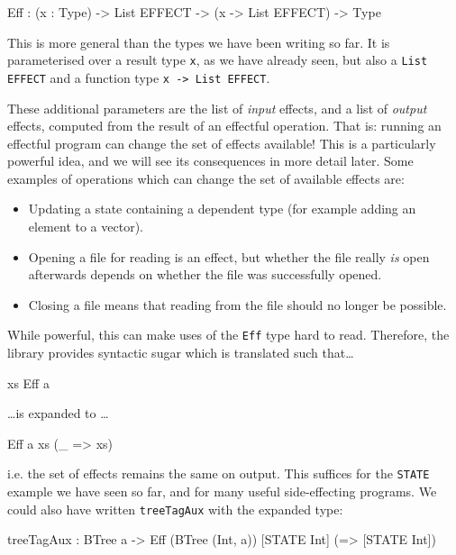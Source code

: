 \begin{code}
Eff : (x : Type) ->
      List EFFECT -> (x -> List EFFECT) -> Type
\end{code}

\noindent
This is more general than the types we have been writing so far. It is
parameterised over a result type \texttt{x},
as we have already seen, but also a \texttt{List EFFECT} and a function type
\texttt{x -> List EFFECT}.

These additional parameters are the list of \emph{input} effects, and a list
of \emph{output} effects, computed from the result of an effectful operation.
That is: running an effectful program can change the set of effects available!
This is a particularly powerful idea, and we will see its consequences in more
detail later. Some examples of operations which can change the set of available
effects are:

\begin{itemize}
\item Updating a state containing a dependent type (for example adding an
element to a vector).
\item Opening a file for reading is an effect, but whether the file really
\emph{is} open afterwards depends on whether the file was successfully opened.
\item Closing a file means that reading from the file should no longer be
possible.
\end{itemize}

\noindent
While powerful, this can make uses of the \texttt{Eff} type hard to read.
Therefore, the \effects{} library provides syntactic sugar which is translated
such that\ldots

\begin{code}
{ xs } Eff a 
\end{code}

\ldots is expanded to \ldots

\begin{code}
Eff a xs (\_ => xs)
\end{code}

\noindent
i.e. the set of effects remains the same on output. This suffices for the
\texttt{STATE} example we have seen so far, and for many useful side-effecting
programs. We could also have written \texttt{treeTagAux} with the expanded
type:

\begin{code}
treeTagAux : BTree a -> 
             Eff (BTree (Int, a)) [STATE Int] (\x => [STATE Int])
\end{code}

